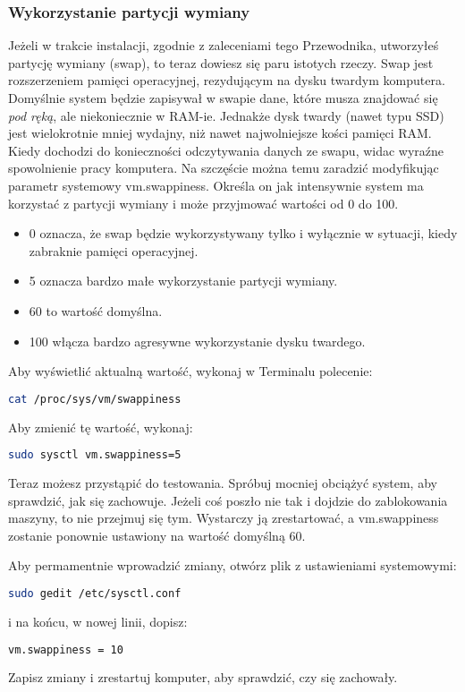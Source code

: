 \subsubsection{Wykorzystanie partycji wymiany}
Jeżeli w trakcie instalacji, zgodnie z zaleceniami tego Przewodnika, utworzyłeś partycję wymiany (swap), to teraz dowiesz się paru istotych rzeczy. Swap jest rozszerzeniem pamięci operacyjnej, rezydującym na dysku twardym komputera. Domyślnie system będzie zapisywał w swapie dane, które musza znajdować się \emph{pod ręką}, ale niekoniecznie w RAM-ie. Jednakże dysk twardy (nawet typu SSD) jest wielokrotnie mniej wydajny, niż nawet najwolniejsze kości pamięci RAM. Kiedy dochodzi do konieczności odczytywania danych ze swapu, widac wyraźne spowolnienie pracy komputera. Na szczęście można temu zaradzić modyfikując parametr systemowy \textcolor{ubuntu_orange}{vm.swappiness}. Określa on jak intensywnie system ma korzystać z partycji wymiany i może przyjmować wartości od 0 do 100.
\begin{itemize}
\item \textcolor{ubuntu_orange}{0} oznacza, że swap będzie wykorzystywany tylko i wyłącznie w sytuacji, kiedy zabraknie pamięci operacyjnej.
\item \textcolor{ubuntu_orange}{5} oznacza bardzo małe wykorzystanie partycji wymiany.
\item \textcolor{ubuntu_orange}{60} to wartość domyślna.
\item \textcolor{ubuntu_orange}{100} włącza bardzo agresywne wykorzystanie dysku twardego.
\end{itemize}
Aby wyświetlić aktualną wartość, wykonaj w Terminalu polecenie:
\begin{lstlisting}[language=bash]
cat /proc/sys/vm/swappiness
\end{lstlisting}
Aby zmienić tę wartość, wykonaj:
\begin{lstlisting}[language=bash]
sudo sysctl vm.swappiness=5
\end{lstlisting}
Teraz możesz przystąpić do testowania. Spróbuj mocniej obciążyć system, aby sprawdzić, jak się zachowuje. Jeżeli coś poszło nie tak i dojdzie do zablokowania maszyny, to nie przejmuj się tym. Wystarczy ją zrestartować, a vm.swappiness zostanie ponownie ustawiony na wartość domyślną 60.

Aby permamentnie wprowadzić zmiany, otwórz plik z ustawieniami systemowymi:
\begin{lstlisting}[language=bash]
sudo gedit /etc/sysctl.conf
\end{lstlisting}
i na końcu, w nowej linii, dopisz:
\begin{lstlisting}[language=bash]
vm.swappiness = 10
\end{lstlisting}
Zapisz zmiany i zrestartuj komputer, aby sprawdzić, czy się zachowały.

